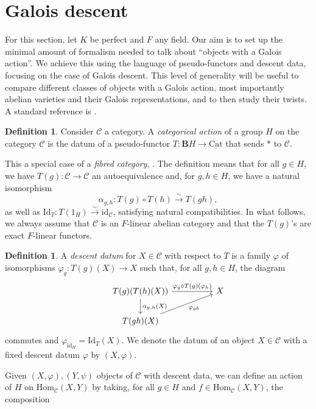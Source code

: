 \documentclass[a4paper,10pt]{amsart}
\theoremstyle{plain}
\theoremstyle{definition}
\newtheorem{definition}[theorem]{Definition}
\theoremstyle{remark}
\def\ul#1{\underline{#1}}
\def\mr#1{\mathrm{#1}}
\def\Ccal{\mathcal{C}}
\def\Bbf{\mathbf{B}}
\renewcommand{\hom}{\mr{Hom}}
\begin{document}
\section{Galois descent}\label{sec: galois descent}
For this section, let \(K\) be perfect and \(F\) any field. Our aim is to set up the minimal amount of formalism needed to talk about ``objects with a Galois action''. We achieve this using the language of pseudo-functors and descent data, focusing on the case of Galois descent. This level of generality will be useful to compare different classes of objects with a Galois action, most importantly abelian varieties and their Galois representations, and to then study their twists. A standard reference is \cite{FGA}.

\begin{definition}
Consider \(\Ccal\) a category. A \emph{categorical action} of a group \(H\) on the category \(\Ccal\) is the datum of a pseudo-functor \(T \colon \Bbf H \to \ul{\mr{Cat}}\) that sends \(\ast\) to \(\Ccal\).
\end{definition}
This a special case of a \emph{fibred category}, \cite[Definition 1.1]{FGA}. The definition means that for all \(g \in H\), we have \(T(g) \colon \Ccal \to \Ccal\) an autoequivalence and, for \(g, h \in H\), we have a natural isomorphism
\[
    \alpha_{g,h} \colon T(g) \circ T(h) \xrightarrow{\sim} T(gh),
\]
as well as \(\mr{Id}_T \colon T(1_H) \xrightarrow{\sim} \mr{id}_\Ccal\), 
satisfying natural compatibilities.
In what follows, we always assume that \(\Ccal\) is an \(F\)-linear abelian category and that the \(T(g)\)'s are exact \(F\)-linear functors. 
\begin{definition}
    A \emph{descent datum} for \(X \in \Ccal\) with respect to \(T\) is a family \(\varphi\) of isomorphisms \(\varphi_g \colon T(g)(X) \to X\) such that, for all \(g, h \in H\), the diagram
\[
\begin{tikzcd}
    & T(g)(T(h)(X)) \arrow[d, "{\alpha_{g, h}}(X)"] \arrow[rr, "\varphi_g \circ T(g)({\varphi_{h}})"] && X \\
    & T(gh)(X) \arrow[urr, "{\varphi_{gh}}", swap]
\end{tikzcd}
\]
commutes and \(\varphi_{\mr{id}_H} = \mr{Id}_T(X)\). We denote the datum of an object \(X \in \Ccal\) with a fixed descent datum \(\varphi\) by \((X, \varphi)\).
\end{definition}
Given \((X, \varphi),  (Y, \psi)\) objects of \(\Ccal\) with descent data, we can define an action of \(H\) on \(\hom_\Ccal(X, Y)\) by taking, for all \(g \in H\) and \(f \in \hom_\Ccal(X, Y)\), the composition
\end{document}
